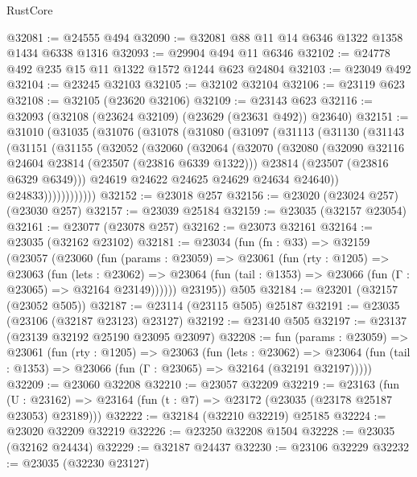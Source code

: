 \begin{lexlean}{RustCore}
\begin{coremodule}
@32081 := @24555 @494
@32090 := @32081 @88 @11 @14 @6346 @1322 @1358 @1434 @6338 @1316
@32093 := @29904 @494 @11 @6346
@32102 := @24778 @492 @235 @15 @11 @1322 @1572 @1244 @623 @24804
@32103 := @23049 @492
@32104 := @23245 @32103
@32105 := @32102 @32104
@32106 := @23119 @623
@32108 := @32105 (@23620 @32106)
@32109 := @23143 @623
@32116 := @32093 (@32108 (@23624 @32109) (@23629 (@23631 @492)) @23640)
@32151 := @31010
    (@31035
      (@31076
        (@31078
          (@31080
            (@31097
              (@31113
                (@31130
                  (@31143
                    (@31151
                      (@31155
                        (@32052
                          (@32060
                            (@32064
                              (@32070
                                (@32080
                                  (@32090 @32116 @24604 @23814 (@23507 (@23816 @6339 @1322)))
                                  @23814
                                  (@23507 (@23816 @6329 @6349)))
                                @24619
                                @24622
                                @24625
                                @24629
                                @24634
                                @24640))
                            @24833))))))))))))
@32152 := @23018 @257
@32156 := @23020 (@23024 @257) (@23030 @257)
@32157 := @23039 @25184
@32159 := @23035 (@32157 @23054)
@32161 := @23077 (@23078 @257)
@32162 := @23073 @32161
@32164 := @23035 (@32162 @23102)
@32181 := @23034
    (fun (fn : @33) =>
    @32159
      (@23057
        (@23060
          (fun (params : @23059) =>
          @23061
            (fun (rty : @1205) =>
            @23063
              (fun (lets : @23062) =>
              @23064 (fun (tail : @1353) => @23066 (fun (Γ : @23065) => @32164 @23149))))))
        @23195))
    @505
@32184 := @23201 (@32157 (@23052 @505))
@32187 := @23114 (@23115 @505) @25187
@32191 := @23035 (@23106 (@32187 @23123) @23127)
@32192 := @23140 @505
@32197 := @23137 (@23139 @32192 @25190 @23095 @23097)
@32208 := fun (params : @23059) =>
  @23061
    (fun (rty : @1205) =>
    @23063
      (fun (lets : @23062) =>
      @23064 (fun (tail : @1353) => @23066 (fun (Γ : @23065) => @32164 (@32191 @32197)))))
@32209 := @23060 @32208
@32210 := @23057 @32209
@32219 := @23163
    (fun (U : @23162) => @23164 (fun (t : @7) => @23172 (@23035 (@23178 @25187 @23053) @23189)))
@32222 := @32184 (@32210 @32219) @25185
@32224 := @23020 @32209 @32219
@32226 := @23250 @32208 @1504
@32228 := @23035 (@32162 @24434)
@32229 := @32187 @24437
@32230 := @23106 @32229
@32232 := @23035 (@32230 @23127)

\end{coremodule}
\end{lexlean}
